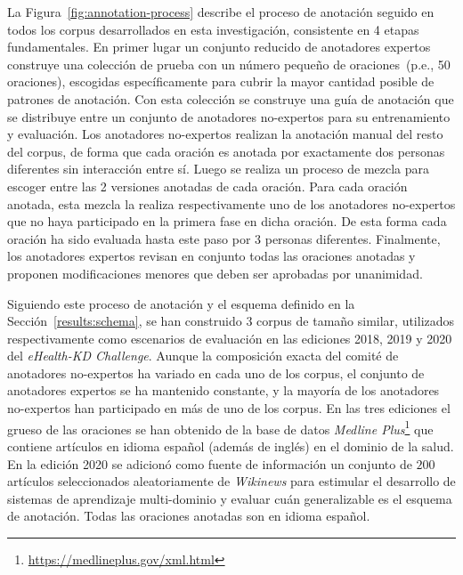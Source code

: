 La Figura~\ref{fig:annotation-process} describe el proceso de anotación seguido en todos los corpus desarrollados en esta investigación, consistente en 4 etapas fundamentales. En primer lugar un conjunto reducido de anotadores expertos
construye una colección de prueba con un número pequeño de oraciones~(p.e., 50 oraciones), escogidas específicamente
para cubrir la mayor cantidad posible de patrones de anotación. Con esta colección se construye una guía de anotación que se distribuye entre un conjunto de anotadores no-expertos para su entrenamiento y evaluación. Los anotadores no-expertos realizan la anotación manual del resto del corpus, de forma que cada oración es anotada por exactamente dos personas diferentes sin interacción entre sí.
Luego se realiza un proceso de mezcla para escoger entre las 2 versiones anotadas de cada oración.
Para cada oración anotada, esta mezcla la realiza respectivamente uno de los anotadores no-expertos que no haya participado en la primera fase en dicha oración. De esta forma cada oración ha sido evaluada hasta este paso por 3 personas diferentes.
Finalmente, los anotadores expertos revisan en conjunto todas las oraciones anotadas y proponen modificaciones menores que deben ser aprobadas por unanimidad.

Siguiendo este proceso de anotación y el esquema definido en la Sección~\ref{results:schema}, se han construido 3 corpus de tamaño similar, utilizados respectivamente como escenarios de evaluación en las ediciones 2018, 2019 y 2020 del \textit{eHealth-KD Challenge}.
Aunque la composición exacta del comité de anotadores no-expertos ha variado en cada uno de los corpus, el conjunto de anotadores expertos se ha mantenido constante, y la mayoría de los anotadores no-expertos han participado en más de uno de los corpus.
En las tres ediciones el grueso de las oraciones se han obtenido de la base de datos \textit{Medline Plus}\footnote{\url{https://medlineplus.gov/xml.html}} que contiene artículos en idioma español (además de inglés) en el dominio de la salud. En la edición 2020 se adicionó como fuente de información un conjunto de $200$ artículos seleccionados aleatoriamente de \textit{Wikinews} para estimular el desarrollo de sistemas de aprendizaje multi-dominio y evaluar cuán generalizable es el esquema de anotación.
Todas las oraciones anotadas son en idioma español.

